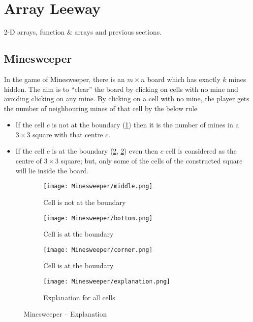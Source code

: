 \section{Array Leeway}
\begin{topics}
2-D arrays, function \& arrays and previous sections.
\end{topics}
\subsection{Minesweeper}
In the game of Minesweeper, there is an $m\times n$ board which has exactly $k$ mines hidden. The aim is to ``clear'' the board by clicking on cells with no mine and avoiding clicking on any mine. By clicking on a cell with no mine, the player gets the number of neighbouring mines of that cell by the below rule
\begin{itemize}	
	\item If the cell $c$ is not at the boundary (\ref{fig:minecnb}) then it is the number of mines in a $3\times3$ square with that centre $c$.
	\item If the cell $c$ is at the boundary (\ref{fig:minecb1}, \ref{fig:minecb1}) even then $c$ cell is considered as the centre of $3\times3$ square; but, only some of the cells of the constructed square will lie inside the board.
\end{itemize}
\begin{figure}[H]
	\centering
	\begin{subfigure}[t]{0.26\linewidth}
		\centering
		\texttt{[image: Minesweeper/middle.png]}
		\caption{Cell is not at the boundary}
		\label{fig:minecnb}
	\end{subfigure}
	\begin{subfigure}[t]{0.22\linewidth}
		\centering
		\texttt{[image: Minesweeper/bottom.png]}
		\caption{Cell is at the boundary}
		\label{fig:minecb1}
	\end{subfigure}
	\begin{subfigure}[t]{0.22\linewidth}
		\centering
		\texttt{[image: Minesweeper/corner.png]}
		\caption{Cell is at the boundary}
		\label{fig:minecb2}
	\end{subfigure}
	\begin{subfigure}[t]{0.23\linewidth}
		\centering
		\texttt{[image: Minesweeper/explanation.png]}
		\caption{Explanation for all cells}
		\label{fig:minee}
	\end{subfigure}
	\caption{Minesweeper -- Explanation}
\end{figure}

